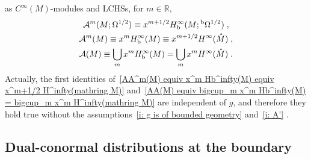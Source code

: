 \documentclass{memo-l}
\theoremstyle{plain}
\theoremstyle{definition}
\theoremstyle{remark}
\newcommand{\R}{\mathbb{R}}
\renewcommand{\AA}{\mathcal{A}}
\newcommand{\bOmega}{{}^{\text{\rm b}}\Omega}
\newcommand{\Hb}{H_{\text{\rm b}}}
\numberwithin{section}{chapter}
\numberwithin{equation}{section}%
\begin{document}
as $C^\infty(M)$-modules and LCHSs, for $m\in\R$,
\begin{gather}
\AA^m(M;\Omega^{1/2})\equiv x^{m+1/2}\Hb^\infty(M;\bOmega^{1/2})\;,\notag\\
\AA^m(M)\equiv x^m\Hb^\infty(M)\equiv x^{m+1/2}H^\infty(\mathring M)\;,
\label{AA^m(M) equiv x^m Hb^infty(M) equiv x^m+1/2 H^infty(mathring M)}\\
\AA(M)\equiv\bigcup_mx^m\Hb^\infty(M)=\bigcup_mx^mH^\infty(\mathring M)\;.
\label{AA(M) equiv bigcup_m x^m Hb^infty(M) = bigcup_m x^m H^infty(mathring M)}
\end{gather}
Actually, the first identities of~\eqref{AA^m(M) equiv x^m Hb^infty(M) equiv x^m+1/2 H^infty(mathring M)} and~\eqref{AA(M) equiv bigcup_m x^m Hb^infty(M) = bigcup_m x^m H^infty(mathring M)} are independent of $g$, and therefore they hold true without the assumptions~\ref{i: g is of bounded geometry} and~\ref{i: A'} \cite[Remark~6.41]{AlvKordyLeichtnam-conormal}.


\subsection{Dual-conormal distributions at the boundary}\label{ss: AA'(M)}
\end{document}
